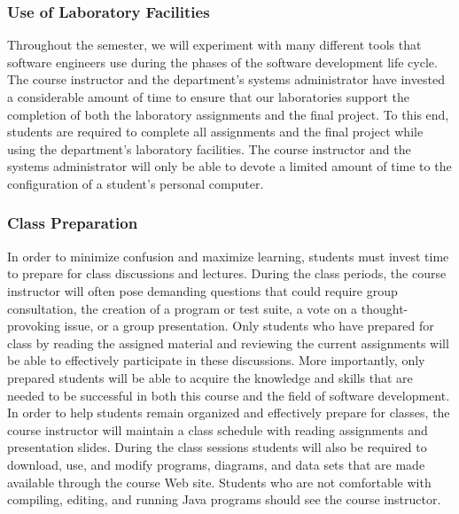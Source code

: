 \subsubsection*{Use of Laboratory Facilities}

Throughout the semester, we will experiment with many different tools that software engineers use during the phases of
the software development life cycle.  The course instructor and the department's systems administrator have invested a
considerable amount of time to ensure that our laboratories support the completion of both the laboratory assignments and the
final project.  To this end, students are required to complete all assignments and the final project while using the
department's laboratory facilities. The course instructor and the systems administrator will only be able to devote a
limited amount of time to the configuration of a student's personal computer.

\subsubsection*{Class Preparation}

% 

In order to minimize confusion and maximize learning, students must invest time to prepare for class discussions and
lectures.  During the class periods, the course instructor will often pose demanding questions that could require group
consultation, the creation of a program or test suite, a vote on a thought-provoking issue, or a group presentation.
Only students who have prepared for class by reading the assigned material and reviewing the current assignments will be
able to effectively participate in these discussions.  More importantly, only prepared students will be able to acquire
the knowledge and skills that are needed to be successful in both this course and the field of software development.  In
order to help students remain organized and effectively prepare for classes, the course instructor will maintain a class
schedule with reading assignments and presentation slides.   During the class sessions students will also be required to
download, use, and modify programs, diagrams, and data sets that are made available through the course Web site.
Students who are not comfortable with compiling, editing, and running Java programs should see the course instructor.

